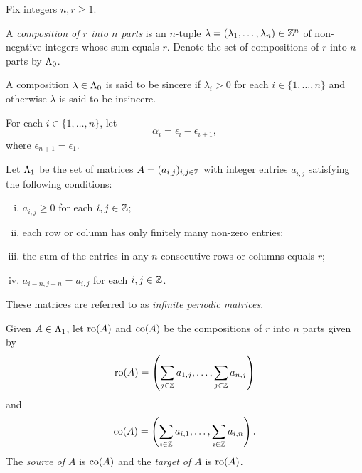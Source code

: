 \documentclass[a4paper, 11pt]{report}
\begin{document}
Fix integers $n,r\geq 1$.

\begin{definition}\label{def:compositions}
A \emph{composition of $r$ into $n$ parts} is an $n$-tuple $\lambda=(\lambda_1,\ldots,\lambda_n)\in\mathbb{Z}^n$ of non-negative integers whose sum equals $r$. Denote the set of compositions of $r$ into $n$ parts by $\Lambda_0{}$.
\end{definition}

A composition $\lambda\in\Lambda_0{}$ is said to be sincere if $\lambda_i>0$ for each $i\in\{1,\ldots,n\}$ and otherwise $\lambda$ is said to be insincere.

For each $i\in\{1,\ldots,n\}$, let
\begin{equation*}
\alpha_i = \epsilon_i - \epsilon_{i+1},
\end{equation*}
where $\epsilon_{n+1}=\epsilon_1$.

\begin{definition}\label{def:matrices}
Let $\Lambda_1{}$ be the set of matrices $A=(a_{i,j})_{i,j\in\mathbb{Z}}$ with integer entries $a_{i,j}$ satisfying the following conditions: 
\begin{enumerate}[i.]
\item
$a_{i,j}\geq 0$ for each $i,j\in\mathbb{Z}$;
\item
each row or column has only finitely many non-zero entries;
\item
the sum of the entries in any $n$ consecutive rows or columns equals $r$;
\item
$a_{i-n,j-n}=a_{i,j}$ for each $i,j\in\mathbb{Z}$.
\end{enumerate}
These matrices are referred to as \emph{infinite periodic matrices}.
\end{definition}

\begin{definition}\label{def:source-target}
Given $A\in\Lambda_1{}$, let $\operatorname{ro}(A)$ and $\operatorname{co}(A)$ be the compositions of $r$ into $n$ parts given by
\begin{equation*}
\operatorname{ro}(A) = \left( \sum_{j\in\mathbb{Z}}a_{1,j}, \ldots, \sum_{j\in\mathbb{Z}} a_{n,j}\right)
\end{equation*}
and
\begin{equation*}
\operatorname{co}(A) = \left( \sum_{i\in\mathbb{Z}} a_{i,1}, \ldots, \sum_{i\in\mathbb{Z}} a_{i,n}\right).
\end{equation*}
The \emph{source of $A$} is $\operatorname{co}(A)$ and the \emph{target of $A$} is $\operatorname{ro}(A)$.
\end{definition}
\end{document}
